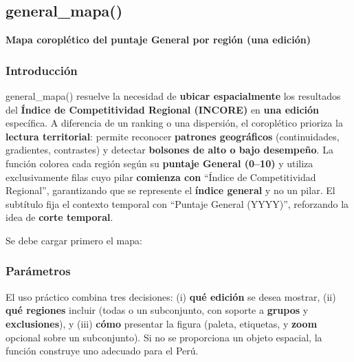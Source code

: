 \documentclass[
  11pt,
  letterpaper,
  DIV=11,
  numbers=noendperiod]{scrartcl}
\begin{document}
\subsection{\texorpdfstring{\textbf{general\_mapa()}}{general\_mapa()}}\label{general_mapa}

\textbf{Mapa coroplético del puntaje General por región (una edición)}

\subsubsection{\texorpdfstring{\textbf{Introducción}}{Introducción}}\label{introducciuxf3n-7}

general\_mapa() resuelve la necesidad de \textbf{ubicar espacialmente}
los resultados del \textbf{Índice de Competitividad Regional (INCORE)}
en \textbf{una edición} específica. A diferencia de un ranking o una
dispersión, el coroplético prioriza la \textbf{lectura territorial}:
permite reconocer \textbf{patrones geográficos} (continuidades,
gradientes, contrastes) y detectar \textbf{bolsones de alto o bajo
desempeño}. La función colorea cada región según su \textbf{puntaje
General (0--10)} y utiliza exclusivamente filas cuyo pilar
\textbf{comienza con} ``Índice de Competitividad Regional'',
garantizando que se represente el \textbf{índice general} y no un pilar.
El subtítulo fija el contexto temporal con ``Puntaje General (YYYY)'',
reforzando la idea de \textbf{corte temporal}.

Se debe cargar primero el mapa:

\subsubsection{\texorpdfstring{\textbf{Parámetros}}{Parámetros}}\label{paruxe1metros-6}

El uso práctico combina tres decisiones: (i) \textbf{qué edición} se
desea mostrar, (ii) \textbf{qué regiones} incluir (todas o un
subconjunto, con soporte a \textbf{grupos} y \textbf{exclusiones}), y
(iii) \textbf{cómo} presentar la figura (paleta, etiquetas, y
\textbf{zoom} opcional sobre un subconjunto). Si no se proporciona un
objeto espacial, la función construye uno adecuado para el Perú.
\end{document}

